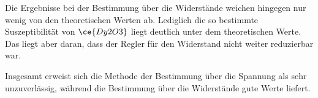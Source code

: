 \documentclass[
  bibliography=totoc,     %
  captions=tableheading,  %
  titlepage=firstiscover, %
]{scrartcl}
\begin{document}
\noindent
Die Ergebnisse bei der Bestimmung über die Widerstände weichen hingegen nur wenig
von den theoretischen Werten ab. Lediglich die so bestimmte Suszeptibilität von
$\ce{Dy2O3}$ liegt deutlich unter dem theoretischen Werte. Das liegt aber daran,
dass der Regler für den Widerstand nicht weiter reduzierbar war.

\noindent
Insgesamt erweist sich die Methode der Bestimmung über die Spannung als sehr
unzuverlässig, während die Bestimmung über die Widerstände gute Werte liefert.
\clearpage
\nocite{*}
\printbibliography
\end{document}
